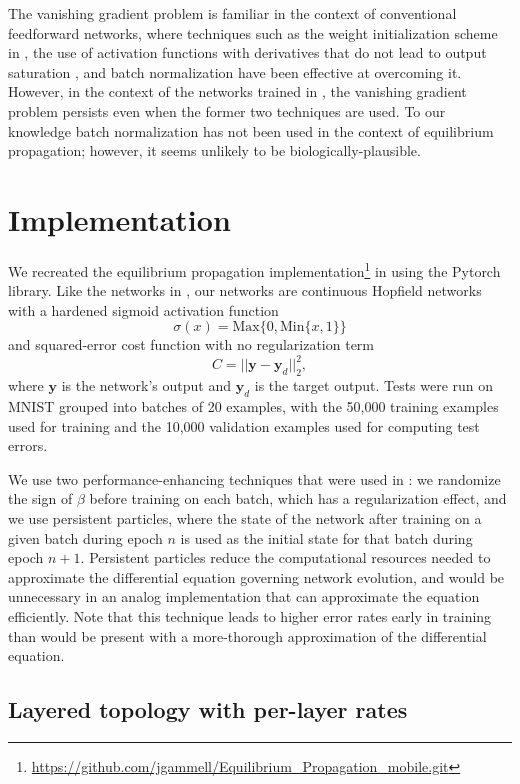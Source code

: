 \documentclass[utf8]{frontiersSCNS}
\newcommand{\mtx}[1]{\bm{#1}}
\begin{document}
The vanishing gradient problem is familiar in the context of conventional feedforward networks, where techniques such as the weight initialization scheme in \citep{glorot2010}, the use of activation functions with derivatives that do not lead to output saturation \citep{schmidhuber2015}, and batch normalization \citep{ioffe2015} have been effective at overcoming it. However, in the context of the networks trained in \citep{scellier17}, the vanishing gradient problem persists even when the former two techniques are used. To our knowledge batch normalization has not been used in the context of equilibrium propagation; however, it seems unlikely to be biologically-plausible.

\section{Implementation}
\label{sec:implementation}

We recreated the equilibrium propagation implementation\footnote{\url{https://github.com/jgammell/Equilibrium_Propagation_mobile.git}} in \citep{scellier17} using the Pytorch library. Like the networks in \citep{scellier17}, our networks are continuous Hopfield networks with a hardened sigmoid activation function $$\sigma(x)=\text{Max}\{0, \text{Min}\{x, 1\}\}$$ and squared-error cost function with no regularization term $$C=||\mtx{y}-\mtx{y}_d||_2^2,$$ where $\mtx{y}$ is the network's output and $\mtx{y}_d$ is the target output. Tests were run on MNIST \citep{mnist1998} grouped into batches of 20 examples, with the 50,000 training examples used for training and the 10,000 validation examples used for computing test errors.

We use two performance-enhancing techniques that were used in \citep{scellier17}: we randomize the sign of $\beta$ before training on each batch, which has a regularization effect, and we use persistent particles, where the state of the network after training on a given batch during epoch $n$ is used as the initial state for that batch during epoch $n+1$. Persistent particles reduce the computational resources needed to approximate the differential equation governing network evolution, and would be unnecessary in an analog implementation that can approximate the equation efficiently. Note that this technique leads to higher error rates early in training than would be present with a more-thorough approximation of the differential equation.

\subsection{Layered topology with per-layer rates}
\label{sec:basic_topology}
\end{document}
